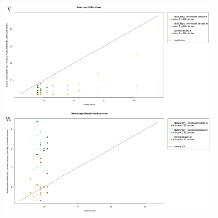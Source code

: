 \documentclass[a4paper,12pt]{article}
\begin{document}
\begin{figure}[h!]
\begin{center}
\includegraphics[width=15cm,height=16cm]{ApoLowCountScootsN.png}
\end{center}
\end{figure}
\end{document}
